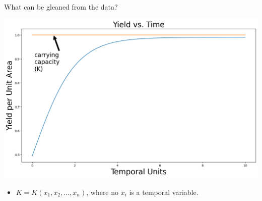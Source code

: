 \documentclass[t,9pt,aspectratio=169]{beamer}
\begin{document}
\begin{frame}{What can be gleaned from the data?}
 
 \begin{center}
\includegraphics[scale=0.25]{./figures/yields.png}
 \end{center}
 
 \begin{itemize}
  \item $K = K(x_1, x_2, \dots, x_n)$, where no $x_i$ is a temporal variable.
 \end{itemize}
 
\end{frame}
\end{document}
